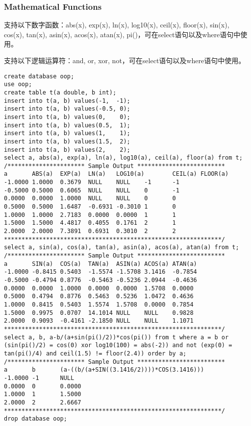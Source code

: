 \documentclass[12pt,a4paper]{article}
\begin{document}
\subsubsection{Mathematical Functions}
\label{sec:math}

支持以下数字函数：abs(x), exp(x), ln(x), log10(x), ceil(x), floor(x), sin(x), cos(x), tan(x), asin(x), acos(x), atan(x), pi()，可在select语句以及where语句中使用。

支持以下逻辑运算符：and, or, xor, not，可在select语句以及where语句中使用。

\begin{lstlisting}
create database oop;
use oop;
create table t(a double, b int); 
insert into t(a, b) values(-1,  -1); 
insert into t(a, b) values(-0.5, 0); 
insert into t(a, b) values(0, 	 0); 
insert into t(a, b) values(0.5,	 1); 
insert into t(a, b) values(1, 	 1); 
insert into t(a, b) values(1.5,	 2); 
insert into t(a, b) values(2,	 2); 
select a, abs(a), exp(a), ln(a), log10(a), ceil(a), floor(a) from t;
/********************** Sample Output *************************
a       ABS(a)  EXP(a)  LN(a)   LOG10(a)        CEIL(a) FLOOR(a) 
-1.0000 1.0000  0.3679  NULL    NULL    -1      -1      
-0.5000 0.5000  0.6065  NULL    NULL    0       -1      
0.0000  0.0000  1.0000  NULL    NULL    0       0       
0.5000  0.5000  1.6487  -0.6931 -0.3010 1       0       
1.0000  1.0000  2.7183  0.0000  0.0000  1       1       
1.5000  1.5000  4.4817  0.4055  0.1761  2       1       
2.0000  2.0000  7.3891  0.6931  0.3010  2       2      
**************************************************************/
select a, sin(a), cos(a), tan(a), asin(a), acos(a), atan(a) from t;
/********************** Sample Output *************************
a       SIN(a)  COS(a)  TAN(a)  ASIN(a) ACOS(a) ATAN(a) 
-1.0000 -0.8415 0.5403  -1.5574 -1.5708 3.1416  -0.7854 
-0.5000 -0.4794 0.8776  -0.5463 -0.5236 2.0944  -0.4636 
0.0000  0.0000  1.0000  0.0000  0.0000  1.5708  0.0000  
0.5000  0.4794  0.8776  0.5463  0.5236  1.0472  0.4636  
1.0000  0.8415  0.5403  1.5574  1.5708  0.0000  0.7854  
1.5000  0.9975  0.0707  14.1014 NULL    NULL    0.9828  
2.0000  0.9093  -0.4161 -2.1850 NULL    NULL    1.1071  
**************************************************************/
select a, b, a-b/(a+sin(pi()/2))*cos(pi()) from t where a = b or (sin(pi()/2) = cos(0) xor log10(100) = abs(-2)) and not (exp(0) = tan(pi()/4) and ceil(1.5) != floor(2.4)) order by a;
/********************** Sample Output *************************
a       b       (a-((b/(a+SIN((3.1416/2))))*COS(3.1416)))       
-1.0000 -1      NULL    
0.0000  0       0.0000  
1.0000  1       1.5000  
2.0000  2       2.6667  
**************************************************************/
drop database oop;
\end{lstlisting}
\end{document}
